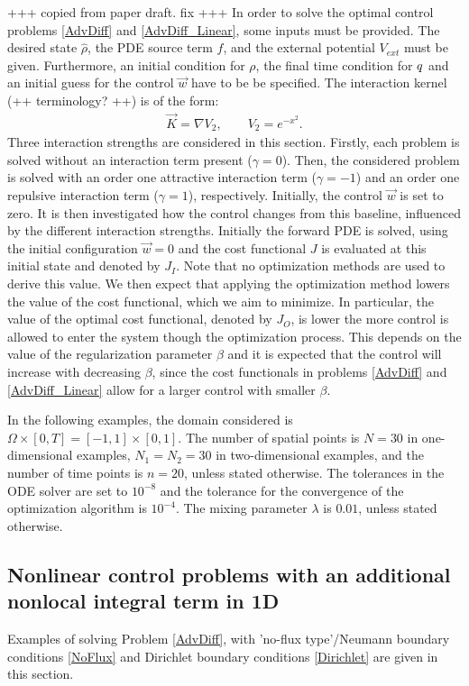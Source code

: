 +++  copied from paper draft. fix +++
In order to solve the optimal control problems \eqref{AdvDiff} and \eqref{AdvDiff_Linear}, some inputs must be provided. The desired state $\widehat \rho$, the PDE source term $f$, and the external potential $V_{ext}$ must be given. Furthermore, an initial condition for $\rho$, the final time condition for $q$ and an initial guess for the control $\vec{w}$ have to be be specified. 
The interaction kernel (++ terminology? ++) is of the form:
\begin{align*}
\vec{K} = \nabla V_2, \qquad V_2 = e^{-x^2}.
\end{align*}
Three interaction strengths are considered in this section. Firstly, each problem is solved without an interaction term present ($\gamma = 0$). Then, the considered problem is solved with an order one attractive interaction term ($\gamma = -1$) and an order one repulsive interaction term ($\gamma = 1$), respectively. Initially, the control $\vec{w}$ is set to zero. It is then investigated how the control changes from this baseline, influenced by the different interaction strengths. 
Initially the forward PDE is solved, using the initial configuration $\vec{w}=0$ and the cost functional $J$ is evaluated at this initial state and denoted by $J_I$. Note that no optimization methods are used to derive this value. We then expect that applying the optimization method lowers the value of the cost functional, which we aim to minimize. 
In particular, the value of the optimal cost functional, denoted by $J_O$, is lower the more control is allowed to enter the system though the optimization process. 
This depends on the value of the regularization parameter $\beta$ and it is expected that the control will increase with decreasing $\beta$, since the cost functionals in problems \eqref{AdvDiff} and \eqref{AdvDiff_Linear} allow for a larger control with smaller $\beta$. 

In the following examples, the domain considered is $\Omega \times [0,T] = [-1,1] \times [0,1]$. The number of spatial points is $N=30$ in one-dimensional examples, $N_1 = N_2 = 30$ in two-dimensional examples, and the number of time points is $n=20$, unless stated otherwise. The tolerances in the ODE solver are set to $10^{-8}$ and the tolerance for the convergence of the optimization algorithm is $10^{-4}$. The mixing parameter $\lambda$ is $0.01$, unless stated otherwise.
\subsection{Nonlinear control problems with an additional nonlocal integral term in 1D} \label{sec:Examples1d}
Examples of solving Problem \eqref{AdvDiff}, with 'no-flux type'/Neumann boundary conditions \eqref{NoFlux} and Dirichlet boundary conditions \eqref{Dirichlet} are given in this section. 
 
